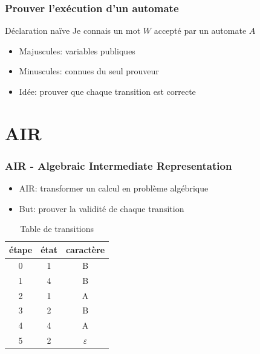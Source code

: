 \documentclass{beamer}
\begin{document}
\begin{frame}
\frametitle{Prouver l'exécution d'un automate}

\begin{block}{Déclaration naïve}
Je connais un mot $W$ accepté par un automate $A$
\end{block}

\begin{itemize}
    \item Majuscules: variables publiques
    \item Minuscules: connues du seul prouveur
    \item Idée: prouver que chaque transition est correcte
\end{itemize}

\end{frame}
\section{AIR}
\begin{frame}
\frametitle{AIR - Algebraic Intermediate Representation}
\begin{itemize}
    \item AIR: transformer un calcul en problème algébrique
    \item But: prouver la validité de chaque transition
\end{itemize}

\begin{table}[h]
\centering
\begin{tabular}{ccc}
\toprule
étape & état & caractère \\
\midrule
0 & 1 & B \\
1 & 4 & B \\
2 & 1 & A \\
3 & 2 & B \\
4 & 4 & A \\
5 & 2 & $\varepsilon$ \\
\bottomrule
\end{tabular}
\caption{Table de transitions}
\label{tab:transitions}
\end{table}

\end{frame}
\end{document}
